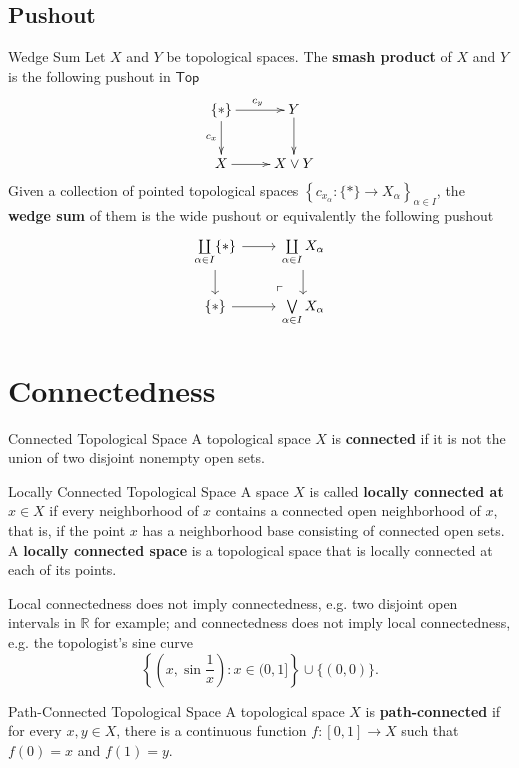 \documentclass{report}
\newcommand{\Top}{\mathsf{Top}}
\begin{document}
\subsection{Pushout}


\begin{definition}{Wedge Sum}{}
	Let $X$ and $Y$ be topological spaces. The \textbf{smash product} of $X$ and $Y$ is the following pushout in $\Top$
	\[\xymatrix{
	\{*\}\ar[r]^{c_y}\ar[d]_{c_x}  &Y\ar[d]_{}\\
	X\ar@{->}[r]_{}&X\vee Y
		}\]
	Given a collection of pointed topological spaces $\left\{c_{x_\alpha}:\{*\}\to X_\alpha\right\}_{\alpha\in I}$, the \textbf{wedge sum} of them is the wide pushout or equivalently the following pushout
	\[
	\begin{tikzcd}[ampersand replacement=\&]
		\coprod\limits_{\alpha\in I} \{*\} \arrow[r] \arrow[d] \& \coprod\limits_{\alpha\in I} X_{\alpha} \arrow[d] \\
		\{*\} \arrow[r] \& \bigvee\limits_{\alpha\in I} X_\alpha \arrow[ul, phantom, "\ulcorner", very near start] 
	\end{tikzcd}
	\]
\end{definition}



\section{Connectedness}
\begin{definition}{Connected Topological Space}{}
	A topological space $X$ is \textbf{connected} if it is not the union of two disjoint nonempty open sets.
\end{definition}

\begin{definition}{Locally Connected Topological Space}{}
	A space $X$ is called \textbf{locally connected at $x\in X$} if every neighborhood of $x$ contains a connected open neighborhood of $x$, that is, if the point $x$ has a neighborhood base consisting of connected open sets. A \textbf{locally connected space} is a topological space that is locally connected at each of its points.
\end{definition}

Local connectedness does not imply connectedness, e.g. two disjoint open intervals in $\mathbb {R}$ for example; and connectedness does not imply local connectedness, e.g. the topologist's sine curve $$\left\{\left(x, \sin \frac{1}{x}\right): x \in(0,1]\right\} \cup\{(0,0)\}.$$
\begin{definition}{Path-Connected Topological Space}{}
	A topological space $X$ is \textbf{path-connected} if for every $x,y\in X$, there is a continuous function $f:[0,1]\to X$ such that $f(0)=x$ and $f(1)=y$.
\end{definition}
\end{document}
